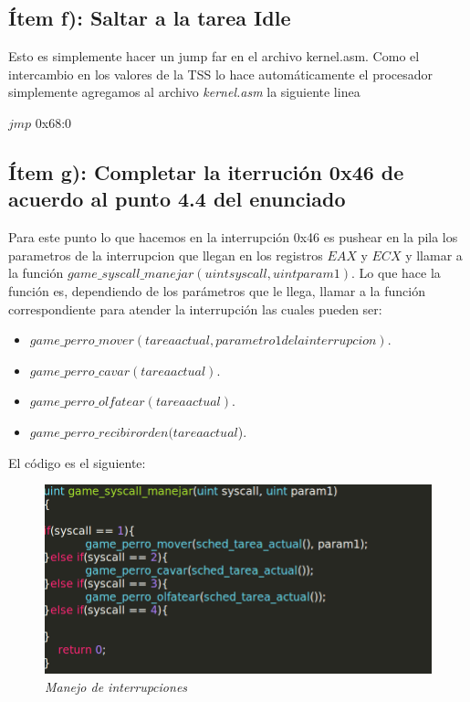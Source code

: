 \subsection{Ítem f): Saltar a la tarea Idle}
Esto es simplemente hacer un jump far en el archivo kernel.asm. Como el intercambio en los valores de la TSS lo hace automáticamente el procesador simplemente agregamos al archivo \textit{kernel.asm} la siguiente linea\\
 \begin{center}
 $jmp$ 0x68:0 \\
 \end{center}

 \subsection{Ítem g): Completar la iterrución 0x46 de acuerdo al punto 4.4 del enunciado}
Para este punto lo que hacemos en la interrupción 0x46 es pushear en la pila los parametros de la interrupcion que llegan en los registros $EAX$ y $ECX$ y llamar a la función $game\_syscall\_manejar(uint syscall, uint param1)$. Lo que hace la función es, dependiendo de los parámetros que le llega, llamar a la función correspondiente para atender la interrupción las cuales pueden ser:\\

\begin{itemize}

\item $game\_perro\_mover(tarea actual, parametro 1 de la interrupcion)$.
\item $game\_perro\_cavar(tarea actual)$.
\item $game\_perro\_olfatear(tarea actual)$.
\item $game\_perro\_recibirorden(tarea actual$).

\end{itemize}

El código es el siguiente:\\

\begin{figure}[H]
\begin{center}
\includegraphics[width=\linewidth]{ejercicio6/syscall_manejar.png}
\caption{{\small \textit{Manejo de interrupciones}}}
\endminipage
\end{center}
\end{figure}

